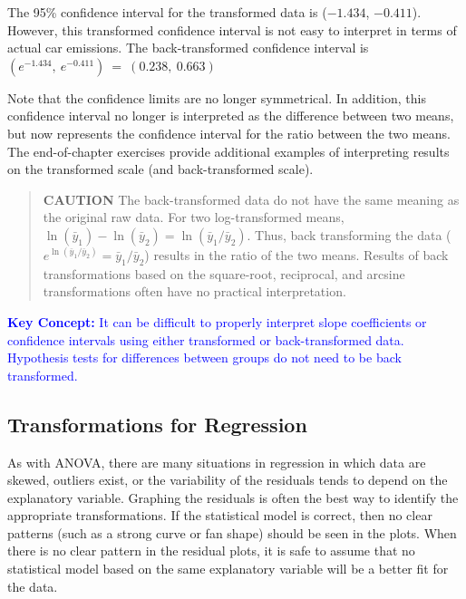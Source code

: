 \documentclass[
]{report}
\begin{document}
The 95\% confidence interval for the transformed data is (\(\scriptstyle -1.434\), \(\scriptstyle -0.411\)). However, this transformed confidence interval is not easy to interpret in terms of actual car emissions. The back-transformed confidence interval is
\(\scriptstyle (e^{-1.434},\  e^{-0.411}) \ =\  (0.238,\  0.663)\)

Note that the confidence limits are no longer symmetrical. In addition, this confidence interval no longer is interpreted as the difference between two means, but now represents the confidence interval for the ratio between the two means. The end-of-chapter exercises provide additional examples of interpreting results on the transformed scale (and back-transformed scale).

\begin{quote}
\textbf{CAUTION} The back-transformed data do not have the same meaning as the original raw data. For two log-transformed means, \(\scriptstyle \ln(\bar{y}_1) - \ln(\bar{y}_2) = \ln(\bar{y}_1/\bar{y}_2)\). Thus, back transforming the data (\(\scriptstyle e^{\ln(\bar{y}_1/\bar{y}_2)} = \bar{y}_1/\bar{y}_2\)) results in the ratio of the two means. Results of back transformations based on the square-root, reciprocal, and arcsine transformations often have no practical interpretation.
\end{quote}

\textbf{\textcolor{blue}{Key Concept:}} \textcolor{blue}{It can be difficult to properly interpret slope coefficients or confidence intervals using either transformed or back-transformed data. Hypothesis tests for differences between groups do not need to be back transformed.}

\hypertarget{transformations-for-regression}{%
\subsection*{Transformations for Regression}\label{transformations-for-regression}}

As with ANOVA, there are many situations in regression in which data are skewed, outliers exist, or the variability of the residuals tends to depend on the explanatory variable. Graphing the residuals is often the best way to identify the appropriate transformations. If the statistical model is correct, then no clear patterns (such as a strong curve or fan shape) should be seen in the plots. When there is no clear pattern in the residual plots, it is safe to assume that no statistical model based on the same explanatory variable will be a better fit for the data.
\end{document}

